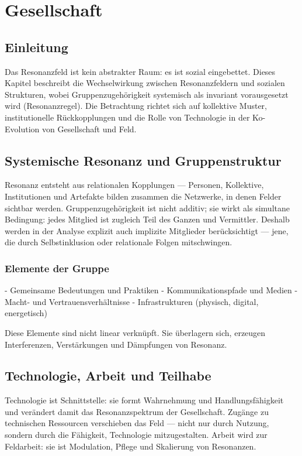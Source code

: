 
\chapter{Gesellschaft}
\label{ch:gesellschaft}

\section*{Einleitung}
Das Resonanzfeld ist kein abstrakter Raum: es ist sozial eingebettet. Dieses Kapitel beschreibt die Wechselwirkung zwischen Resonanzfeldern und sozialen Strukturen, wobei Gruppenzugehörigkeit systemisch als invariant vorausgesetzt wird (Resonanzregel). Die Betrachtung richtet sich auf kollektive Muster, institutionelle Rückkopplungen und die Rolle von Technologie in der Ko-Evolution von Gesellschaft und Feld.

\section{Systemische Resonanz und Gruppenstruktur}
Resonanz entsteht aus relationalen Kopplungen — Personen, Kollektive, Institutionen und Artefakte bilden zusammen die Netzwerke, in denen Felder sichtbar werden. Gruppenzugehörigkeit ist nicht additiv; sie wirkt als simultane Bedingung: jedes Mitglied ist zugleich Teil des Ganzen und Vermittler. Deshalb werden in der Analyse explizit auch implizite Mitglieder berücksichtigt — jene, die durch Selbstinklusion oder relationale Folgen mitschwingen.

\subsection{Elemente der Gruppe}
- Gemeinsame Bedeutungen und Praktiken
- Kommunikationspfade und Medien
- Macht- und Vertrauensverhältnisse
- Infrastrukturen (physisch, digital, energetisch)

Diese Elemente sind nicht linear verknüpft. Sie überlagern sich, erzeugen Interferenzen, Verstärkungen und Dämpfungen von Resonanz.

\section{Technologie, Arbeit und Teilhabe}
Technologie ist Schnittstelle: sie formt Wahrnehmung und Handlungsfähigkeit und verändert damit das Resonanzspektrum der Gesellschaft. Zugänge zu technischen Ressourcen verschieben das Feld — nicht nur durch Nutzung, sondern durch die Fähigkeit, Technologie mitzugestalten. Arbeit wird zur Feldarbeit: sie ist Modulation, Pflege und Skalierung von Resonanzen.

